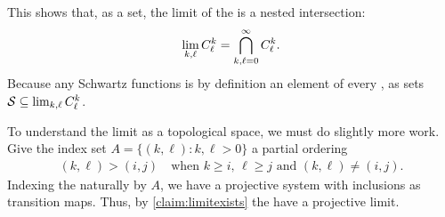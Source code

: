       \begin{rmk}
        This shows that, as a set, the limit of the \Ckl is a nested intersection:
        \begin{align*}
          \lim_{k,\ell}{C^k_\ell} = \bigcap_{k,\ell=0}^\infty {C^k_\ell}\text{.}
        \end{align*}
        Because any Schwartz functions is by definition an element of every \Ckl, as sets $\mathcal{S}\subseteq\lim_{k,\ell}{C^k_\ell}$.
      \end{rmk}

      To understand the limit as a topological space, we must do slightly more work.
      Give the index set $A=\{(k,\ell):k,\ell>0\}$ a partial ordering
      \begin{align*}
        (k,\ell) > (i,j) \quad\text{when $k\ge i$, $\ell\ge j$ and $(k,\ell) \ne (i,j)$.} 
      \end{align*}
      Indexing the \Ckl naturally by $A$, we have a projective system with inclusions as transition maps.
      Thus, by \cref{claim:limitexists} the \Ckl have a projective limit.

